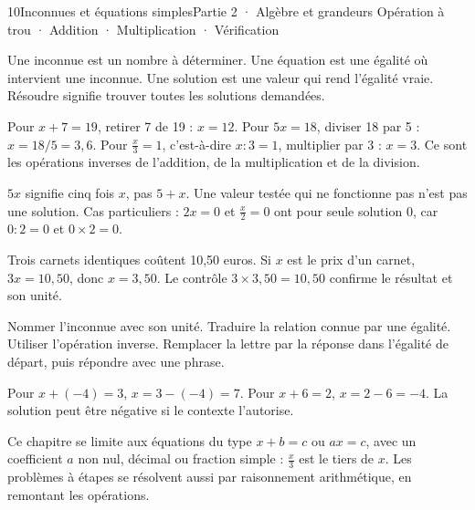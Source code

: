 \begin{ouverture}[calcul]{10}{Inconnues et équations simples}{Partie 2 · Algèbre et grandeurs}
{Opération à trou · Addition · Multiplication · Vérification}
\end{ouverture}
\pagestyle{otMain}\essentiel\fontsize{11}{15}\selectfont
{}\label{cours-10-1}
\begin{definition}Une inconnue est un nombre à déterminer. Une équation est une égalité où intervient une inconnue. Une solution est une valeur qui rend l’égalité vraie. Résoudre signifie trouver toutes les solutions demandées.\end{definition}
\label{fig-cours-10-1-cours-equation}

\begin{savoirfaire}Pour $x+7=19$, retirer 7 de 19 : $x=12$. Pour $5x=18$, diviser 18 par 5 : $x=18/5=3{,}6$. Pour $\frac x3=1$, c’est-à-dire $x:3=1$, multiplier par 3 : $x=3$. Ce sont les opérations inverses de l’addition, de la multiplication et de la division.\end{savoirfaire}
\begin{attention}$5x$ signifie cinq fois $x$, pas $5+x$. Une valeur testée qui ne fonctionne pas n’est pas une solution. Cas particuliers : $2x=0$ et $\frac x2=0$ ont pour seule solution 0, car $0:2=0$ et $0\times2=0$.\end{attention}
\clearpage
{}\label{cours-10-2}
\begin{exemple}Trois carnets identiques coûtent 10,50 euros. Si $x$ est le prix d’un carnet, $3x=10{,}50$, donc $x=3{,}50$. Le contrôle $3\times3{,}50=10{,}50$ confirme le résultat et son unité.\end{exemple}
\begin{savoirfaire}Nommer l’inconnue avec son unité. Traduire la relation connue par une égalité. Utiliser l’opération inverse. Remplacer la lettre par la réponse dans l’égalité de départ, puis répondre avec une phrase.\end{savoirfaire}
\begin{exemple}Pour $x+(-4)=3$, $x=3-(-4)=7$. Pour $x+6=2$, $x=2-6=-4$. La solution peut être négative si le contexte l’autorise.\end{exemple}
\begin{attention}Ce chapitre se limite aux équations du type $x+b=c$ ou $ax=c$, avec un coefficient $a$ non nul, décimal ou fraction simple : $\frac x3$ est le tiers de $x$. Les problèmes à étapes se résolvent aussi par raisonnement arithmétique, en remontant les opérations.\end{attention}


